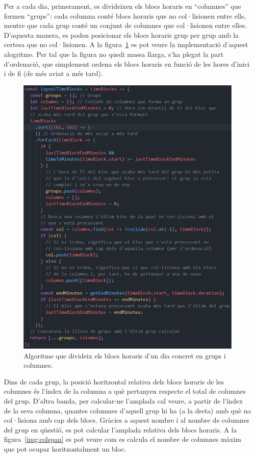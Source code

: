 \documentclass[a4paper,12pt]{ThesisStyle}
\begin{document}
Per a cada dia, primerament, es divideixen els blocs horaris en ``columnes'' que formen ``grups'': cada columna conté blocs horaris que no col·lisionen entre ells, mentre que cada grup conté un conjunt de columnes que col·lisionen entre elles. D'aquesta manera, es poden posicionar els blocs horaris grup per grup amb la certesa que no col·lisionen. A la figura~\ref{img:layout} es pot veure la implementació d'aquest alogritme. Per tal que la figura no quedi massa llarga, s'ha plegat la part d'ordenació, que simplement ordena els blocs horaris en funció de les hores d'inici i de fi (de més aviat a més tard).

\begin{figure}[H]
  \centering
  \includegraphics[width=\textwidth]{assets/code/usabilitat/layout.png}
  \caption{\label{img:layout} Algoritme que divideix els blocs horaris d'un dia concret en grups i columnes.}
\end{figure}

Dins de cada grup, la posició horitzontal relativa dels blocs horaris de les columnes és l'índex de la columna a què pertanyen respecte el total de columnes del grup. D'altra banda, per calcular-ne l'amplada cal veure, a partir de l'índex de la seva columna, quantes columnes d'aquell grup hi ha (a la dreta) amb què no col·lisiona amb cap dels blocs. Gràcies a aquest nombre i al nombre de columnes del grup en qüestió, es pot calcular l'amplada relativa dels blocs horaris. A la figura~\ref{img:colspan} es pot veure com es calcula el nombre de columnes màxim que pot ocupar horitzontalment un bloc.
\end{document}
